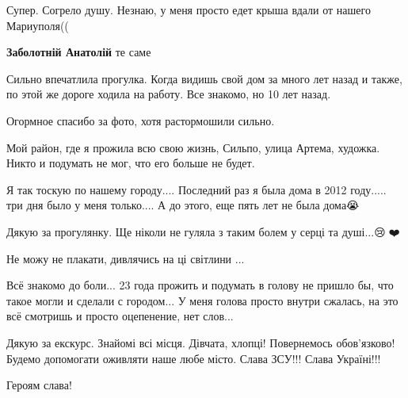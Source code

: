  
 
 
 
 

\qqSecCmt


Супер. Согрело душу. Незнаю, у меня просто едет крыша вдали от нашего Мариуполя((

\begin{itemize} %
\textbf{Заболотній Анатолій} те саме
\end{itemize} %


Сильно впечатлила прогулка. Когда видишь свой дом за много лет назад и также,
по этой же дороге ходила на работу. Все знакомо, но 10 лет назад.

Огормное спасибо за фото, хотя растормошили сильно.


Мой район, где я прожила всю свою жизнь, Сильпо, улица Артема, художка. Никто и
подумать не мог, что его больше не будет.


Я так тоскую по нашему городу.... Последний раз я была дома в 2012 году..... три
дня было у меня только.... А до этого, еще пять лет не была дома😭


Дякую за прогулянку. Ще ніколи не гуляла з таким болем у серці та душі...😢🙏❤️


Не можу не плакати, дивлячись на ці світлини
...


Всё знакомо до боли... 23 года прожить и подумать в голову не пришло бы, что
такое могли и сделали с городом... У меня голова просто внутри сжалась, на это
всё смотришь и просто оцепенение, нет слов...


Дякую за екскурс. Знайомі всі місця. Дівчата, хлопці! Повернемось обов'язково!
Будемо допомогати оживляти наше любе місто. Слава ЗСУ!!! Слава Україні!!!


Героям слава!

